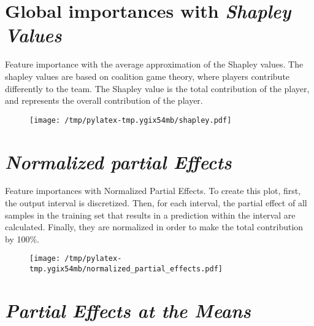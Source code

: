 \documentclass{article}%
\begin{document}
                \lfoot{}
                \cfoot{}
                \rfoot{\thepage\ | \pageref{LastPage}}
\section*{Global importances with \textit{Shapley Values}}%
\label{sec:GlobalimportanceswithtextitShapleyValues}%

                Feature importance with the average approximation of the 
                Shapley values. The shapley values are based on coalition game
                theory, where players contribute differently to the team. The
                Shapley value is the total contribution of the player, and
                represents the overall contribution of the player.
            
                \vfill%


\begin{figure}[H]%
\centering%
\texttt{[image: /tmp/pylatex-tmp.ygix54mb/shapley.pdf]}%
\end{figure}

%
\vfill \pagebreak

%
\section*{\textit{Normalized partial Effects}}%
\label{sec:textitNormalizedpartialEffects}%

                Feature importances with Normalized Partial Effects. 
                To create this plot, first, the output interval is discretized.
                Then, for each interval, the partial effect of all samples
                in the training set that results in a prediction within the
                interval are calculated. Finally, they are normalized in
                order to make the total contribution by 100\%.

                \vfill%


\begin{figure}[H]%
\centering%
\texttt{[image: /tmp/pylatex-tmp.ygix54mb/normalized\_partial\_effects.pdf]}%
\end{figure}

%
\vfill \pagebreak

%
\section*{\textit{Partial Effects at the Means}}%
\label{sec:textitPartialEffectsattheMeans}%
\end{document}
